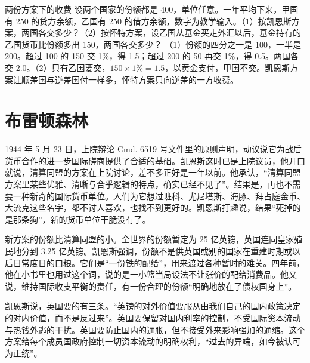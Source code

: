 \begin{example}{两份方案下的收费}\label{ex:warfinance-bancor}
设两个国家的份额都是 400，单位任意。一年平均下来，甲国有 250 的贷方余额，乙国有 250 的借方余额，数字为教学输入。（1）按凯恩斯方案，两国各交多少？（2）按怀特方案，设乙国从基金买走外汇以后，基金持有的乙国货币比份额多出 150，两国各交多少？
\solution
（1）份额的四分之一是 100，一半是 200。超过 100 的 150 交 1\%，得 1.5；超过 200 的 50 再交 1\%，得 0.5。两国各交 2.0。（2）只有乙国要交，$150\times1\%=1.5$，以黄金支付，甲国不交。凯恩斯方案让顺差国与逆差国付一样多，怀特方案只向逆差的一方收费。
\end{example}

\section{布雷顿森林}\label{sec:warfinance-bw}

1944 年 5 月 23 日，上院辩论 Cmd. 6519 号文件里的原则声明，动议说它为战后货币合作的进一步国际磋商提供了合适的基础\cite{hansard1944}。凯恩斯这时已是上院议员，他开口就说，清算同盟的方案在上院讨论，差不多正好是一年以前\cite{hansard1944}。他承认，“清算同盟方案里某些优雅、清晰与合乎逻辑的特点，确实已经不见了”\cite{hansard1944}。结果是，再也不需要一种新奇的国际货币单位\cite{hansard1944}。人们为它想过班科、尤尼塔斯、海豚、拜占庭金币、大流克这些名字，都不讨人喜欢，也找不到更好的。凯恩斯打趣说，结果“死掉的是那条狗”，新的货币单位干脆没有了\cite{hansard1944}。

新方案的份额比清算同盟的小。全世界的份额暂定为 25 亿英镑，英国连同皇家殖民地分到 3.25 亿英镑\cite{hansard1944}。凯恩斯强调，份额不是供英国或别的国家在重建时期或以后日常度日的口粮\cite{hansard1944}。它们是“一份铁的配给”，用来渡过各种暂时的难关\cite{hansard1944}。四年前，他在小书里也用过这个词，说的是一小篮当局设法不让涨价的配给消费品\cite{keynes1940}。他又说，维持国际收支平衡的责任，有一份合理的份额“明确地放在了债权国身上”\cite{hansard1944}。

凯恩斯说，英国要的有三条。“英镑的对外价值要服从由我们自己的国内政策决定的对内价值，而不是反过来”\cite{hansard1944}。英国要保留对国内利率的控制，不受国际资本流动与热钱外逃的干扰\cite{hansard1944}。英国要防止国内的通胀，但不接受外来影响强加的通缩\cite{hansard1944}。这个方案给每个成员国政府控制一切资本流动的明确权利，“过去的异端，如今被认可为正统”\cite{hansard1944}。

